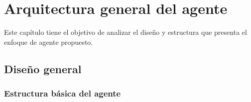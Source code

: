 
\chapter{Arquitectura general del agente}
 \label{chap:arquitectura}

 Este capítulo tiene el objetivo de analizar el diseño y estructura que
 presenta el enfoque de agente propuesto.

\section{Diseño general}
  \label{sec:diseno_general}
  
  
\subsection{Estructura básica del agente}
  \label{sec:estructura_basica_de_agente}
  
  
  
